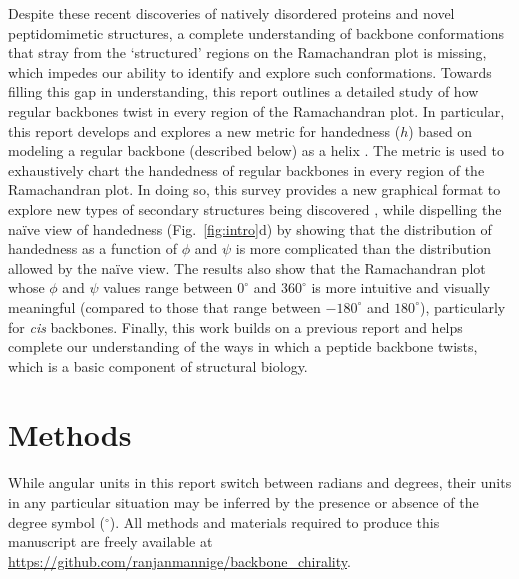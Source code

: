 \documentclass[fleqn,10pt,lineno]{wlpeerj} %
\newcommand{\n}[1]{{\color{black}#1}} %
\newcommand{\Fig}[1]{Fig.~\ref{#1}}
\newcommand{\h}{h}
\newcommand{\cis}{{\em cis}\xspace}
\begin{document}
\n{Despite these recent discoveries of natively disordered proteins and novel peptidomimetic structures, a complete understanding of backbone conformations that stray from the `structured' regions on the Ramachandran plot is missing, which impedes our ability to identify and explore such conformations. Towards filling this gap in understanding, this report outlines a detailed study of how regular backbones twist in every region of the Ramachandran plot. In particular, this report develops and explores a new metric for handedness ($\h$) based on modeling a regular backbone (described below) as a helix \citep{Shimanouchi1955,Miyazawa1961,Zacharias2013}. The metric is used to exhaustively chart the handedness of regular backbones in every region of the Ramachandran plot. In doing so, this survey provides a new graphical format to explore new types of secondary structures being discovered \citep{Mannige2015,Gorske2016}, while dispelling the na{\"i}ve view of handedness (\Fig{fig:intro}d) by showing that the distribution of handedness as a function of $\phi$ and $\psi$ is more complicated than the distribution allowed by the na{\"i}ve view. The results also show that the Ramachandran plot whose $\phi$ and $\psi$ values range between $0^\circ$ and $360^\circ$ is more intuitive and visually meaningful (compared to those that range between $-180^\circ$ and $180^\circ$), particularly for \cis backbones. Finally, this work builds on a previous report \citep{Zacharias2013} and helps complete our understanding of the ways in which a peptide backbone twists, which is a basic component of structural biology.}

\section*{Methods}
\n{While angular units in this report switch between radians and degrees, their units in any particular situation may be inferred by the presence or absence of the degree symbol ($^\circ$).} All methods and materials required to produce this manuscript are freely available at \url{https://github.com/ranjanmannige/backbone_chirality}.
\end{document}
